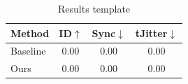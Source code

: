 \begin{table}[t]
\centering
\caption{Results template}
\begin{tabular}{lccc}
\toprule
Method & ID$\uparrow$ & Sync$\downarrow$ & tJitter$\downarrow$\\
\midrule
Baseline & 0.00 & 0.00 & 0.00\\
Ours & 0.00 & 0.00 & 0.00\\
\bottomrule
\end{tabular}
\end{table}
